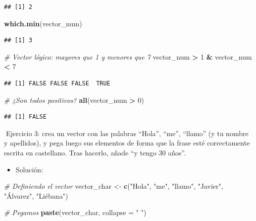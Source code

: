 \documentclass[11pt,]{book}
\newenvironment{Shaded}{\begin{snugshade}}{\end{snugshade}}
\newcommand{\CommentTok}[1]{\textcolor[rgb]{0.37,0.37,0.37}{\textit{#1}}}
\newcommand{\DataTypeTok}[1]{\textcolor[rgb]{0.27,0.27,0.27}{#1}}
\newcommand{\DecValTok}[1]{\textcolor[rgb]{0.06,0.06,0.06}{#1}}
\newcommand{\KeywordTok}[1]{\textcolor[rgb]{0.27,0.27,0.27}{\textbf{#1}}}
\newcommand{\NormalTok}[1]{#1}
\newcommand{\OperatorTok}[1]{\textcolor[rgb]{0.43,0.43,0.43}{\textbf{#1}}}
\newcommand{\StringTok}[1]{\textcolor[rgb]{0.5,0.5,0.5}{#1}}
\providecommand{\tightlist}{%
  \setlength{\itemsep}{0pt}\setlength{\parskip}{0pt}}
\begin{document}
\begin{verbatim}
## [1] 2
\end{verbatim}

\begin{Shaded}
\begin{Highlighting}[]
\KeywordTok{which.min}\NormalTok{(vector_num)}
\end{Highlighting}
\end{Shaded}

\begin{verbatim}
## [1] 3
\end{verbatim}

\begin{Shaded}
\begin{Highlighting}[]
\CommentTok{# Vector lógico: mayores que 1 y menores que 7}
\NormalTok{vector_num }\OperatorTok{>}\StringTok{ }\DecValTok{1} \OperatorTok{&}\StringTok{ }\NormalTok{vector_num }\OperatorTok{<}\StringTok{ }\DecValTok{7}
\end{Highlighting}
\end{Shaded}

\begin{verbatim}
## [1] FALSE FALSE FALSE  TRUE
\end{verbatim}

\begin{Shaded}
\begin{Highlighting}[]
\CommentTok{# ¿Son todos positivos?}
\KeywordTok{all}\NormalTok{(vector_num }\OperatorTok{>}\StringTok{ }\DecValTok{0}\NormalTok{)}
\end{Highlighting}
\end{Shaded}

\begin{verbatim}
## [1] FALSE
\end{verbatim}

📝Ejercicio 3: crea un vector con las palabras ``Hola'', ``me'', ``llamo'' (y tu nombre y apellidos), y pega luego sus elementos de forma que la frase esté correctamente escrita en castellano. Tras hacerlo, añade ``y tengo 30 años''.

\begin{itemize}
\tightlist
\item
  Solución:
\end{itemize}

\begin{Shaded}
\begin{Highlighting}[]
\CommentTok{# Definiendo el vector}
\NormalTok{vector_char <-}\StringTok{ }\KeywordTok{c}\NormalTok{(}\StringTok{"Hola"}\NormalTok{, }\StringTok{"me"}\NormalTok{, }\StringTok{"llamo"}\NormalTok{, }\StringTok{"Javier"}\NormalTok{,}
                 \StringTok{"Álvarez"}\NormalTok{, }\StringTok{"Liébana"}\NormalTok{)}

\CommentTok{# Pegamos}
\KeywordTok{paste}\NormalTok{(vector_char, }\DataTypeTok{collapse =} \StringTok{" "}\NormalTok{)}
\end{Highlighting}
\end{Shaded}
\end{document}
